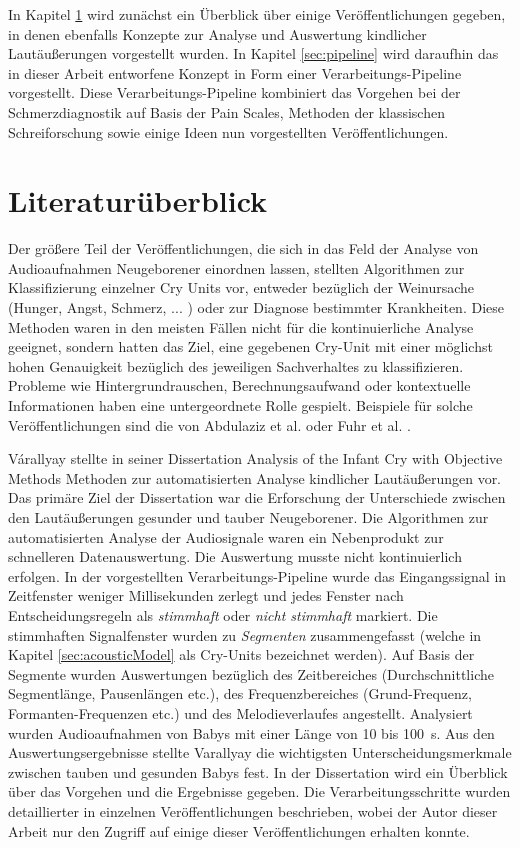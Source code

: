 In Kapitel \ref{sec:system_literature} wird zunächst ein Überblick über einige Veröffentlichungen gegeben, in denen ebenfalls Konzepte zur Analyse und Auswertung kindlicher Lautäußerungen vorgestellt wurden. In Kapitel \ref{sec:pipeline} wird daraufhin das in dieser Arbeit entworfene Konzept in Form einer Verarbeitungs-Pipeline vorgestellt. Diese Verarbeitungs-Pipeline kombiniert das Vorgehen bei der Schmerzdiagnostik auf Basis der Pain Scales, Methoden der klassischen Schreiforschung sowie einige Ideen nun vorgestellten Veröffentlichungen.

\section{Literaturüberblick}
\label{sec:system_literature}

Der größere Teil der Veröffentlichungen, die sich in das Feld der Analyse von Audioaufnahmen Neugeborener einordnen lassen, stellten Algorithmen zur Klassifizierung einzelner Cry Units vor, entweder bezüglich der Weinursache (Hunger, Angst, Schmerz, ... ) oder zur Diagnose bestimmter Krankheiten. Diese Methoden waren in den meisten Fällen nicht für die kontinuierliche Analyse geeignet, sondern hatten das Ziel, eine gegebenen Cry-Unit mit einer möglichst hohen Genauigkeit bezüglich des jeweiligen Sachverhaltes zu klassifizieren. Probleme wie Hintergrundrauschen, Berechnungsaufwand oder kontextuelle Informationen haben eine untergeordnete Rolle gespielt. Beispiele für solche Veröffentlichungen sind die von Abdulaziz et al. \cite{class_abdulaziz} oder Fuhr et al. \cite{comparisonOfLearning}.

Várallyay stellte in seiner Dissertation \glqq Analysis of the Infant Cry with Objective Methods\grqq{} \cite{cry_thesis} Methoden zur automatisierten Analyse kindlicher Lautäußerungen vor. Das primäre Ziel der Dissertation war die Erforschung der Unterschiede zwischen den Lautäußerungen gesunder und tauber Neugeborener. Die Algorithmen zur automatisierten Analyse der Audiosignale waren ein \glqq Nebenprodukt\grqq{} zur schnelleren Datenauswertung. Die Auswertung musste nicht kontinuierlich erfolgen. In der vorgestellten Verarbeitungs-Pipeline wurde das Eingangssignal in Zeitfenster weniger Millisekunden zerlegt und jedes Fenster nach Entscheidungsregeln als \emph{stimmhaft} oder \emph{nicht stimmhaft} markiert. Die stimmhaften Signalfenster wurden zu \emph{Segmenten} zusammengefasst (welche in Kapitel \ref{sec:acousticModel} als Cry-Units bezeichnet werden). Auf Basis der Segmente wurden Auswertungen bezüglich des Zeitbereiches (Durchschnittliche Segmentlänge, Pausenlängen etc.), des Frequenzbereiches (Grund-Frequenz, Formanten-Frequenzen etc.) und des Melodieverlaufes angestellt. Analysiert wurden Audioaufnahmen von Babys mit einer Länge von 10 bis \SI{100}{\second}. Aus den Auswertungsergebnisse stellte Varallyay die wichtigsten Unterscheidungsmerkmale zwischen tauben und gesunden Babys fest. In der Dissertation \cite{cry_thesis} wird ein Überblick über das Vorgehen und die Ergebnisse gegeben. Die Verarbeitungsschritte wurden detaillierter in einzelnen Veröffentlichungen beschrieben, wobei der Autor dieser Arbeit nur den Zugriff auf einige dieser Veröffentlichungen erhalten konnte.

